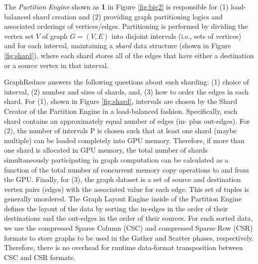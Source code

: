 


The \textit{Partition Engine} shown as \textbf{1} in Figure \ref{fig:big2} is responsible for (1) load-balanced shard creation and (2) providing graph partitioning logics and 
associated orderings of vertices/edges. Partitioning is performed by dividing the vertex set $V$ of graph $G = (V, E)$ into 
disjoint intervals (i.e., sets of vertices) and for each interval, maintaining a \textit{shard} data structure 
(shown in Figure \ref{fig:shard}), where each shard stores all of the edges that have either a destination or a source vertex 
in that interval.


GraphReduce answers the following questions about such sharding: (1) choice of interval, (2) number and sizes of shards,
and, (3) how to order the edges in each shard. For (1), shown in Figure \ref{fig:shard}, %
intervals are chosen by the Shard Creator of the Partition Engine in a load-balanced fashion. Specifically, each shard contains an approximately 
equal number of edges (in- plus out-edges). %
For (2), the number of intervals P is chosen such that at least one shard (maybe multiple) can be loaded completely into 
GPU memory. Therefore, if more than one shard is allocated in GPU memory, the total number of shards simultaneously participating in graph computation can be calculated as a function of the total number of concurrent memory copy operations to and from the GPU. %
 Finally, for (3), the graph dataset is a set of source and destination vertex pairs (edges) with the associated value for each edge.
This set of tuples is generally unordered. The Graph Layout Engine inside of the Partition Engine defines the layout of the data by sorting %
the in-edges in the order of their destinations and the out-edges in the order of their sources. 
For such sorted data, we use the compressed Sparse Column (CSC) and compressed Sparse Row (CSR) formats \cite{csr} to store graphs 
to be used in the Gather and Scatter phases, respectively. Therefore, there is no overhead for runtime data-format transposition between CSC and CSR formats.

